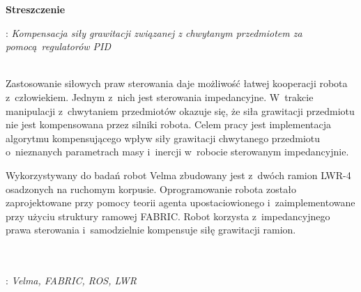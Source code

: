 


\clearpage\mbox{}\thispagestyle{empty}\newpage




%

\clearpage\mbox{}\newpage



\vspace*{\baselineskip}
\begin{center}
	{\large\bfseries Streszczenie}\par\bigskip
\end{center}
: {\itshape Kompensacja siły grawitacji związanej z chwytanym przedmiotem za pomocą regulatorów PID}
\\\\
{
	Zastosowanie siłowych praw sterowania daje możliwość łatwej kooperacji robota z~człowiekiem. Jednym z~nich jest sterowania impedancyjne. W~trakcie manipulacji z~chwytaniem przedmiotów okazuje się, że siła grawitacji przedmiotu nie jest kompensowana przez silniki robota. Celem pracy jest implementacja algorytmu kompensującego wpływ siły grawitacji chwytanego przedmiotu o~nieznanych parametrach masy i~inercji w~robocie sterowanym impedancyjnie.
	
	Wykorzystywany do badań robot Velma zbudowany jest z~dwóch ramion LWR-4 osadzonych na ruchomym korpusie. Oprogramowanie robota zostało zaprojektowane przy pomocy teorii agenta upostaciowionego i~zaimplementowane przy użyciu struktury ramowej FABRIC. Robot korzysta z~impedancyjnego prawa sterowania i~samodzielnie kompensuje siłę grawitacji ramion. 
}\\\\
\vspace*{0.6\baselineskip}
: {\itshape Velma, FABRIC, ROS, LWR}

\clearpage\mbox{}\newpage


